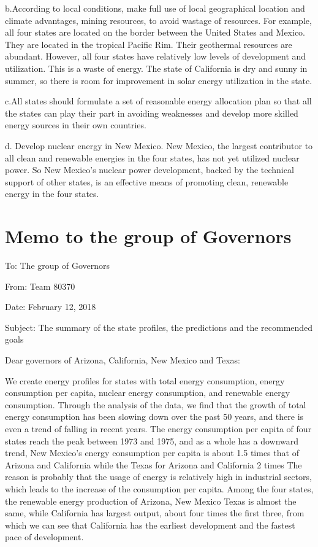 b.According to local conditions, make full use of local geographical location and climate advantages, mining resources, to avoid wastage of resources.  For example, all four states are located on the border between the United States and Mexico. They are located in the tropical Pacific Rim. Their geothermal resources are abundant. However, all four states have relatively low levels of development and utilization. This is a waste of energy.  The state of California is dry and sunny in summer, so there is room for improvement in solar energy utilization in the state.


c.All states should formulate a set of reasonable energy allocation plan so that all the states can play their part in avoiding weaknesses and develop more skilled energy sources in their own countries.


d. Develop nuclear energy in New Mexico. New Mexico, the largest contributor to all clean and renewable energies in the four states, has not yet utilized nuclear power. So New Mexico's nuclear power development, backed by the technical support of other states, is an effective means of promoting clean, renewable energy in the four states.


\section{Memo to the group of Governors}
To: The group of Governors


From: Team 80370


Date: February 12, 2018


Subject: The summary of the state profiles, the predictions and the recommended goals


Dear governors of Arizona, California, New Mexico and Texas:


We create energy profiles for states with total energy consumption, energy consumption per capita, nuclear energy consumption, and renewable energy consumption. Through the analysis of the data, we find that the growth of total energy consumption has been slowing down over the past 50 years, and there is even a trend of falling in recent years. The energy consumption per capita of four states reach the peak between 1973 and 1975, and as a whole has a downward trend, New Mexico's energy consumption per capita is about 1.5 times that of Arizona and California while the Texas for Arizona and California 2 times The reason is probably that the usage of energy is relatively high in industrial sectors, which leads to the increase of the consumption per capita. Among the four states, the renewable energy production of Arizona, New Mexico Texas is almost the same, while California has largest output, about four times the first three, from which we can see that California has the earliest development and the fastest pace of development.


